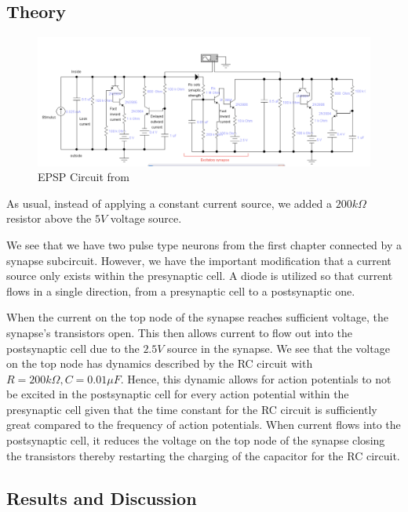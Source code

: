 \documentclass[12]{book}
\newcommand\0{\mathbf{0}}
\newcommand\<{\langle}
\renewcommand\>{\rangle}
\begin{document}
\subsection{Theory}

\begin{figure}[h]
\centering
\includegraphics[width=\textwidth]{excitatory_circuit}	
\caption{EPSP Circuit from \cite{levitan2015neuron}}
\end{figure}

As usual, instead of applying a constant current source, we added a $200k\Omega$ resistor above the $5V$ voltage source.

We see that we have two pulse type neurons from the first chapter connected by a synapse subcircuit. However, we have the important modification that a current source only exists within the presynaptic cell. A diode is utilized so that current flows in a single direction, from a presynaptic cell to a postsynaptic one.  

When the current on the top node of the synapse reaches sufficient voltage, the synapse's transistors open. This then allows current to flow out into the postsynaptic cell due to the $2.5V$ source in the synapse. We see that the voltage on the top node has dynamics described by the RC circuit with $R=200 k \Omega, C = 0.01 \mu F$. Hence, this dynamic allows for action potentials to not be excited in the postsynaptic cell for every action potential within the presynaptic cell given that the time constant for the RC circuit is sufficiently great compared to the frequency of action potentials. When current flows into the postsynaptic cell, it reduces the voltage on the top node of the synapse closing the transistors thereby restarting the charging of the capacitor for the RC circuit.

\subsection{Results and Discussion}
\end{document}
